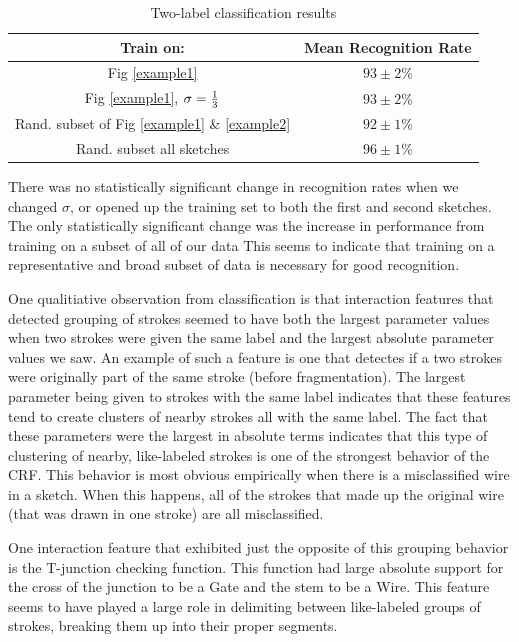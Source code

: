 \documentclass[10pt]{acmsiggraph}               %
\begin{document}
\begin{table}[h]
\begin{center}
	\begin{tabular}{|c|c|}
		\hline
		Train on: & Mean Recognition Rate\\
		\hline
		Fig \ref{example1} & $93 \pm 2$\%\\
		\hline
		Fig \ref{example1}, $\sigma={1 \over 3}$ & $93 \pm 2$\%\\
		\hline
		Rand. subset of Fig \ref{example1} \& \ref{example2} & $92 \pm 1$\%\\
		\hline
		Rand. subset all sketches & $96 \pm 1$\%\\
		\hline
	\end{tabular}
\end{center}
\caption{Two-label classification results}
\label{results}
\end{table}

There was no statistically significant change in recognition rates
when we changed $\sigma$, or opened up the training set to both the
first and second sketches.  The only statistically significant change
was the increase in performance from training on a subset of all of
our data This seems to indicate that training on a representative and
broad subset of data is necessary for good recognition.

One qualitiative observation from classification is that interaction
features that detected grouping of strokes seemed to have both the
largest parameter values when two strokes were given the same label
and the largest absolute parameter values we saw. An example of such a
feature is one that detectes if a two strokes were originally part of
the same stroke (before fragmentation).  The largest parameter being
given to strokes with the same label indicates that these features
tend to create clusters of nearby strokes all with the same label.
The fact that these parameters were the largest in absolute terms
indicates that this type of clustering of nearby, like-labeled strokes
is one of the strongest behavior of the CRF.  This behavior is most
obvious empirically when there is a misclassified wire in a sketch.
When this happens, all of the strokes that made up the original wire
(that was drawn in one stroke) are all misclassified.

One interaction feature that exhibited just the opposite of this
grouping behavior is the T-junction checking function.  This function
had large absolute support for the cross of the junction to be a Gate
and the stem to be a Wire.  This feature seems to have played a large
role in delimiting between like-labeled groups of strokes, breaking
them up into their proper segments.
\end{document}
